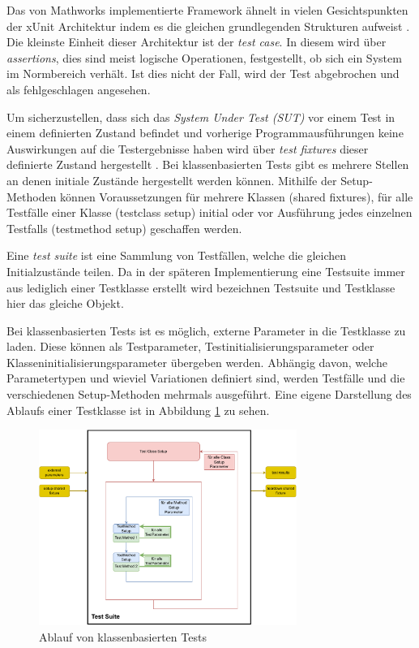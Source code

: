Das von Mathworks implementierte Framework ähnelt in vielen Gesichtspunkten der xUnit Architektur indem es die gleichen grundlegenden Strukturen aufweist \cite{xUnitWiki}. Die kleinste Einheit dieser Architektur ist der \textit{test case}. In diesem wird über \textit{assertions}, dies sind meist logische Operationen, festgestellt, ob sich ein System im Normbereich verhält. Ist dies nicht der Fall, wird der Test abgebrochen und als fehlgeschlagen angesehen.

Um sicherzustellen, dass sich das \textit{System Under Test (SUT)} vor einem Test in einem definierten Zustand befindet und vorherige Programmausführungen keine Auswirkungen auf die Testergebnisse haben wird über \textit{test fixtures} dieser definierte Zustand hergestellt \cite{xUnitpatterns}. Bei klassenbasierten Tests gibt es mehrere Stellen an denen initiale Zustände hergestellt werden können. Mithilfe der Setup-Methoden können Voraussetzungen für mehrere Klassen (shared fixtures), für alle Testfälle einer Klasse (testclass setup) initial oder vor Ausführung jedes einzelnen Testfalls (testmethod setup) geschaffen werden.

Eine \textit{test suite} ist eine Sammlung von Testfällen, welche die gleichen Initialzustände teilen. Da in der späteren Implementierung eine Testsuite immer aus lediglich einer Testklasse erstellt wird bezeichnen Testsuite und Testklasse hier das gleiche Objekt. 

Bei klassenbasierten Tests ist es möglich, externe Parameter in die Testklasse zu laden. Diese können als Testparameter, Testinitialisierungsparameter oder Klasseninitialisierungsparameter übergeben werden. Abhängig davon, welche Parametertypen und wieviel Variationen definiert sind, werden Testfälle und die verschiedenen Setup-Methoden mehrmals ausgeführt. Eine eigene Darstellung des Ablaufs einer Testklasse ist in Abbildung \ref{fig:Testklassen_Ablauf} zu sehen. 

\begin{figure}[ht]
    \centering
    \includegraphics[width=0.75\textwidth]{figures/3_Implementierung/Testklassen_Ablauf.drawio.pdf}
    \caption{Ablauf von klassenbasierten Tests}
    \label{fig:Testklassen_Ablauf}
\end{figure}

